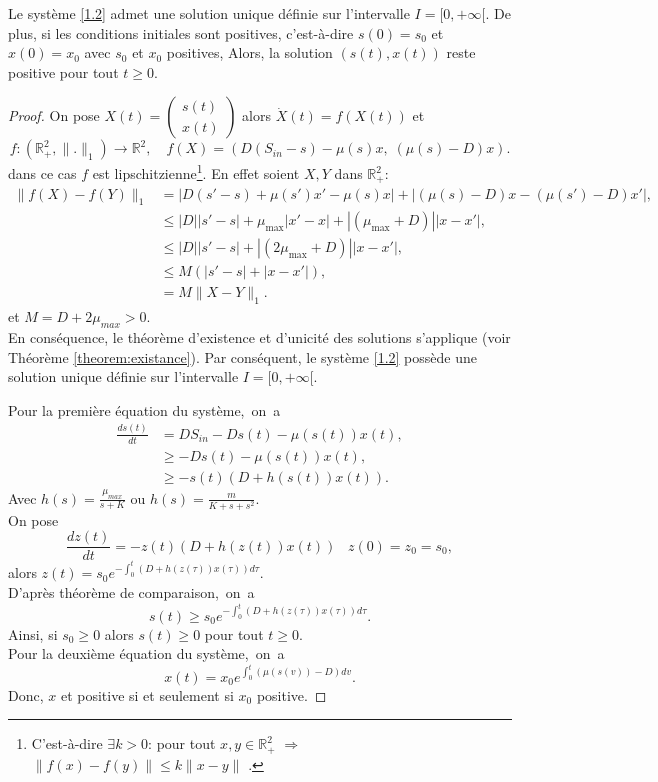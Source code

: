 \documentclass[12pt,a4paper]{report}%
\begin{document}
\begin{théorème}{}{}
Le système \eqref{1.2} admet une solution unique définie sur l'intervalle \(I=[0,+\infty[\). De plus, si les conditions initiales sont positives, c'est-à-dire \(s(0) = s_0\) et \(x(0) = x_0\) avec \(s_0\) et \(x_0\) positives, Alors, la solution \((s(t), x(t))\) reste positive pour tout \(t \geqslant 0\).
\end{théorème} 
\begin{proof}
On pose $X(t)=\begin{pmatrix} 
 s(t) \\ 
 x(t)  
 \end{pmatrix}$ alors \(\dot{X}(t)=f(X(t))\) et
$$
 f : (\mathbb{R}^2_+, \|.\|_{1}) \rightarrow \mathbb{R}^2, \quad f(X) =\left( D \left(S_{in}-s\right) - \mu(s)x ,\;(\mu(s)-D) x \right).
$$
dans ce cas $f$ est lipschitzienne\footnote{ C'est-à-dire $\exists k >0$: pour tout $x,y \in\mathbb{R}^2_+$ $\Rightarrow$ \( \| f(x) - f(y) \| \leq k \| x - y \| \) .}. En effet soient $X, Y$ dans $\mathbb{R}^2_+$:
$$
\begin{aligned}
\|f(X) - f(Y)\|_1 &= |D(s' - s) + \mu(s')x' - \mu(s)x| + |(\mu(s) - D)x - (\mu(s') - D)x'|, \\
&\leq |D||s' - s| + \mu_{\text{max}}|x' - x| + |(\mu_{\text{max}} + D)||x - x'|,\\
&\leq |D||s' - s| + |(2\mu_{\text{max}} + D)||x - x'|,\\
&\leq M (|s' - s|+|x - x'|),\\
&= M \|X-Y\|_1.
\end{aligned}
$$
et $M=D+2\mu_{max}>0$.\\


En conséquence, le théorème d'existence et d'unicité des solutions s'applique (voir Théorème \ref{theorem:existance}). Par conséquent, le système \eqref{1.2} possède une solution unique définie sur l'intervalle \(I=[0,+\infty[\).

Pour la première équation du système, on a 
$$
\begin{aligned}
\frac{d s(t)}{d t} & =D S_{in}-Ds(t)-\mu(s(t))x(t), \\
& \geq -Ds(t)-\mu(s(t))x(t),\\
& \geq -s(t) \left( D+h(s(t))x(t)\right).
\end{aligned}
$$
Avec $h(s)= \frac{\mu_{max}}{s+K}$ ou $h(s)= \frac{m}{K+s+s^2}$.\\
On pose 
$$
 \frac{d z(t)}{d t}=-z(t) \left( D+h(z(t))x(t)\right) \;\;\; z(0)=z_0=s_0,
$$
alors $z(t)=s_0 e^{-\int_0^t\left( D+h(z(\tau))x(\tau)\right)d\tau}$.\\
D'après théorème de comparaison, on a
$$
s(t) \geq s_0 e^{-\int_0^t\left( D+h(z(\tau))x(\tau)\right)d\tau}.
$$
Ainsi, si $s_0 \geq 0$ alors $s(t) \geq 0$ pour tout $t \geq 0$.\\
Pour la deuxième équation du système, on a
$$
x(t)=x_0e^{\int_0^t(\mu(s(v))-D)dv}.
$$ 
Donc, $x$ et positive si et seulement si $x_0$ positive.
\end{proof}
\end{document}
